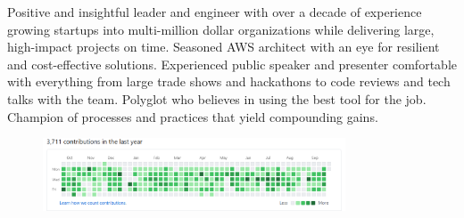 

\begin{cvparagraph}

Positive and insightful leader and engineer with over a decade of experience growing startups into multi-million dollar organizations while delivering large, high-impact projects on time.
Seasoned AWS architect with an eye for resilient and cost-effective solutions.
Experienced public speaker and presenter comfortable with everything from large trade shows and hackathons to code reviews and tech talks with the team.
Polyglot who believes in using the best tool for the job.
Champion of processes and practices that yield compounding gains.
\end{cvparagraph}
\begin{figure}[h]
  \vspace*{-3mm}
  \centering
  \includegraphics[width=0.8\textwidth]{github.png}
\end{figure}

